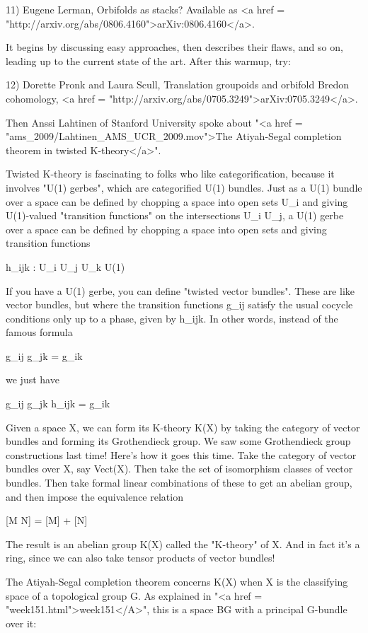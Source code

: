 11) Eugene Lerman, Orbifolds as stacks?  Available as <a href =
"http://arxiv.org/abs/0806.4160">arXiv:0806.4160</a>.

It begins by discussing easy approaches, then describes their flaws,
and so on, leading up to the current state of the art.  After this
warmup, try:

12) Dorette Pronk and Laura Scull, Translation groupoids and orbifold
Bredon cohomology, <a href =
"http://arxiv.org/abs/0705.3249">arXiv:0705.3249</a>.

Then Anssi Lahtinen of Stanford University spoke about "<a href =
"ams_2009/Lahtinen_AMS_UCR_2009.mov">The Atiyah-Segal completion
theorem in twisted K-theory</a>".

Twisted K-theory is fascinating to folks who like categorification,
because it involves "U(1) gerbes", which are categorified
U(1) bundles.  Just as a U(1) bundle over a space can be defined by
chopping a space into open sets U_{i} and giving U(1)-valued
"transition functions" on the intersections U_{i}
\cap  U_{j}, a U(1) gerbe over a space can be defined by
chopping a space into open sets and giving transition functions

h_{ijk} : U_{i} \cap  U_{j} \cap  U_{k}
\to  U(1)

If you have a U(1) gerbe, you can define "twisted vector bundles".
These are like vector bundles, but where the transition functions
g_{ij} satisfy the usual cocycle conditions only up to a phase, given
by h_{ijk}.  In other words, instead of the famous formula

g_{ij} g_{jk} = g_{ik}

we just have

g_{ij} g_{jk} h_{ijk} = g_{ik}

Given a space X, we can form its K-theory K(X) by taking the category
of vector bundles and forming its Grothendieck group.  We saw some
Grothendieck group constructions last time!  Here's how it goes this
time.  Take the category of vector bundles over X, say Vect(X).  Then
take the set of isomorphism classes of vector bundles.  Then take
formal linear combinations of these to get an abelian group, and then
impose the equivalence relation

[M \oplus  N] = [M] + [N]

The result is an abelian group K(X) called the "K-theory" of
X.  And in fact it's a ring, since we can also take tensor products of
vector bundles!

The Atiyah-Segal completion theorem concerns K(X) when X is the
classifying space of a topological group G.  As explained in "<a
href = "week151.html">week151</A>", this is a space BG with a
principal G-bundle over it:

